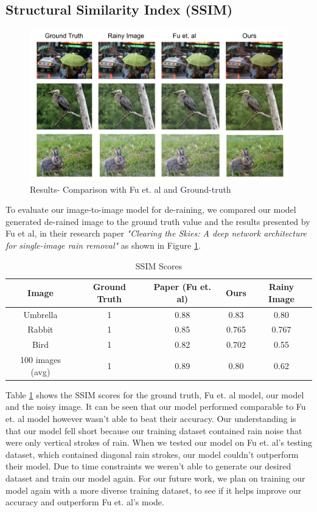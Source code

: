 \documentclass{article}
\begin{document}
\subsection{Structural Similarity Index (SSIM)}

\begin{figure}[H]
	\centering
	\includegraphics[width=\linewidth]{images/ssim.png}
	\caption{Results- Comparison with Fu et. al and Ground-truth}
	\label{figure:2}
\end{figure}

To evaluate our image-to-image model for de-raining, we compared our model generated de-rained image to the ground truth value and the results presented by Fu et al, in their research paper \textit{"Clearing the Skies: A deep network architecture for single-image rain removal"} as shown in Figure \ref{figure:2}. 

\begin{table} [h!]
\centering
\begin{tabular}{ | c | c | c | c | c |}
\hline
 Image & Ground Truth & Paper (Fu et. al) & Ours & Rainy Image \\ 
\hline
 Umbrella & 1 & 0.88 & 0.83 & 0.80 \\
 Rabbit & 1 & 0.85 & 0.765 & 0.767 \\
 Bird & 1 & 0.82 & 0.702 & 0.55 \\
 100 images (avg) & 1 & 0.89 & 0.80 & 0.62 \\
 \hline
\end{tabular}
\caption{SSIM Scores}
\label{table:2}
\end{table}

Table \ref{table:2} shows the SSIM scores for the ground truth, Fu et. al model, our model and the noisy image. It can be seen that our model performed comparable to Fu et. al model however wasn't able to beat their accuracy. Our understanding is that our model fell short because our training dataset contained rain noise that were only vertical strokes of rain. When we tested our model on Fu et. al's testing dataset, which contained diagonal rain strokes, our model couldn't outperform their model. Due to time constraints we weren't able to generate our desired dataset and train our model again. For our future work, we plan on training our model again with a more diverse training dataset, to see if it helps improve our accuracy and outperform Fu et. al's mode. 
\end{document}
